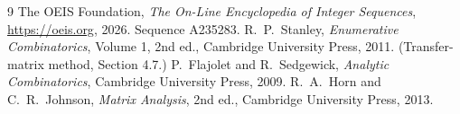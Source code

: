 \documentclass[11pt,a4paper]{article}
\theoremstyle{plain}
\theoremstyle{definition}
\begin{document}
\begin{thebibliography}{9}
 The OEIS Foundation, \emph{The On-Line Encyclopedia of Integer
Sequences}, \url{https://oeis.org}, 2026. Sequence A235283.
 R.~P.~Stanley, \emph{Enumerative Combinatorics}, Volume 1, 2nd ed.,
Cambridge University Press, 2011. (Transfer-matrix method, Section 4.7.)
 P.~Flajolet and R.~Sedgewick, \emph{Analytic Combinatorics}, Cambridge
University Press, 2009.
 R.~A.~Horn and C.~R.~Johnson, \emph{Matrix Analysis}, 2nd ed., Cambridge
University Press, 2013.
\end{thebibliography}
\end{document}
